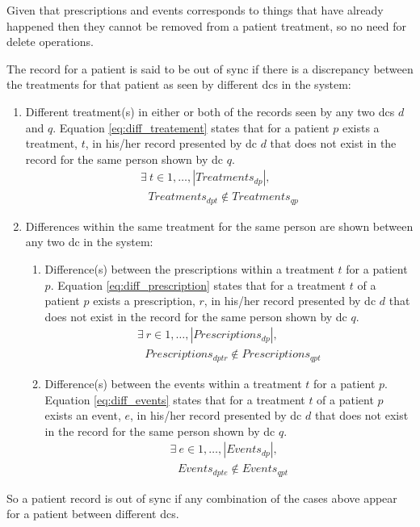Given that prescriptions and events corresponds to things that have already happened then they cannot be removed from a patient treatment, so no need for delete operations.

The record for a patient is said to be out of sync if there is a discrepancy between the treatments for that patient as seen by different \glspl{dc} in the system:
\begin{enumerate}
	\item Different treatment(s) in either or both of the records seen by any two \glspl{dc} $d$ and $q$. Equation \ref{eq:diff_treatement} states that for a patient $p$ exists a treatment, $t$, in his/her record presented by \gls{dc} $d$ that does not exist in the record for the same person shown by \gls{dc} $q$.
		\begin{multline} \label{eq:diff_treatement}
			\exists ~ t \in {1,\dots, |Treatments_{dp}|}, \\ \text{  } Treatments_{dpt} \not\in Treatments_{qp}
		\end{multline}
	\item Differences within the same treatment for the same person are shown between any two \gls{dc} in the system:
		\begin{enumerate}
			\item Difference(s) between the prescriptions within a treatment $t$ for a patient $p$. Equation \ref{eq:diff_prescription} states that for a treatment $t$ of a patient $p$ exists a prescription, $r$, in his/her record presented by \gls{dc} $d$ that does not exist in the record for the same person shown by \gls{dc} $q$.
				\begin{multline} \label{eq:diff_prescription}
					\exists ~ r \in {1,\dots, |Prescriptions_{dp}|}, \\ \text{  } Prescriptions_{dptr} \not\in Prescriptions_{qpt}
				\end{multline}
			\item Difference(s) between the events within a treatment $t$ for a patient $p$. Equation \ref{eq:diff_events} states that for a treatment $t$ of a patient $p$ exists an event, $e$, in his/her record presented by \gls{dc} $d$ that does not exist in the record for the same person shown by \gls{dc} $q$.
				\begin{multline} \label{eq:diff_events}
					\exists ~ e \in {1,\dots, |Events_{dp}|}, \\ \text{  } Events_{dpte} \not\in Events_{qpt}
				\end{multline}
		\end{enumerate}
\end{enumerate}

So a patient record is out of sync if any combination of the cases above appear for a patient between different \glspl{dc}.
